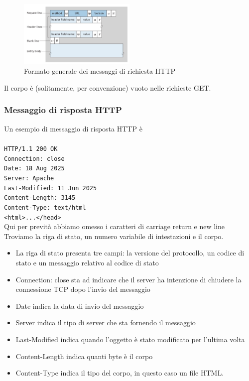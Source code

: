 \documentclass{book}
\begin{document}
\begin{figure}[h]
	\centering
	\includegraphics[width=0.5\textwidth]{images/http_request_message.png}
	\caption{Formato generale dei messaggi di richiesta HTTP}
	\label{fig:esempio}
\end{figure}

Il corpo è (solitamente, per convenzione) vuoto nelle richieste GET.

\subsubsection*{Messaggio di risposta HTTP}
Un esempio di messaggio di risposta HTTP è
\\\\
\texttt{HTTP/1.1 200 OK}\\
\texttt{Connection: close}\\
\texttt{Date: 18 Aug 2025}\\
\texttt{Server: Apache}\\
\texttt{Last-Modified: 11 Jun 2025}\\
\texttt{Content-Length: 3145}\\
\texttt{Content-Type: text/html}\\
\texttt{<html>...</head>}\\

Qui per prevità abbiamo omesso i caratteri di carriage return e new line Troviamo la riga di stato, un numero variabile di intestazioni e il corpo.

\begin{itemize}
	\item La riga di stato presenta tre campi: la versione del protocollo, un codice di stato e un messaggio relativo al codice di stato
	\item Connection: close sta ad indicare che il server ha intenzione di chiudere la connessione TCP dopo l'invio del messaggio
	\item Date indica la data di invio del messaggio
	\item Server indica il tipo di server che sta fornendo il messaggio
	\item Last-Modified indica quando l'oggetto è stato modificato per l'ultima volta
	\item Content-Length indica quanti byte è il corpo
	\item Content-Type indica il tipo del corpo, in questo caso un file HTML.
\end{itemize}
\end{document}
